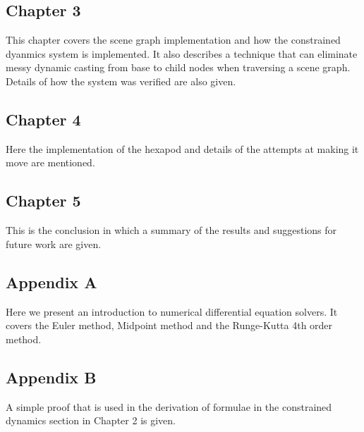 \subsection{Chapter 3}
This chapter covers the scene graph implementation and how the constrained dyanmics
system is implemented. It also describes a technique that can eliminate messy
dynamic casting from base to child nodes when traversing a scene graph. Details
of how the system was verified are also given.

\subsection{Chapter 4} 
Here the implementation of the hexapod and details of the
attempts at making it move are mentioned.

\subsection{Chapter 5}
This is the conclusion in which a summary of the results and suggestions
for future work are given.

\subsection{Appendix A}
Here we present an introduction to numerical differential equation solvers. It
covers the Euler method, Midpoint method and the Runge-Kutta 4th order method.

\subsection{Appendix B}
A simple proof that is used in the derivation of formulae in
the constrained dynamics section in Chapter 2 is given.


